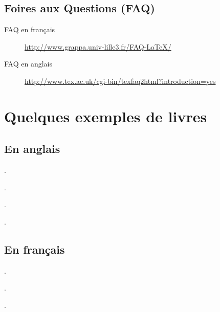 \subsection{Foires aux Questions (FAQ)}
\label{sec:faq}

\begin{description}
\item[FAQ en français] \url{http://www.grappa.univ-lille3.fr/FAQ-LaTeX/}
\item[FAQ en anglais]
  \url{http://www.tex.ac.uk/cgi-bin/texfaq2html?introduction=yes}
\end{description}




 \section{Quelques exemples de livres}

 \subsection{En anglais}

\begin{biblist}
  
  .
  
  .
  
  .
  
  .
  
  
\end{biblist}


\subsection{En français}

\begin{biblist}
  
  .
  
  .
  
  .
  
\end{biblist}




